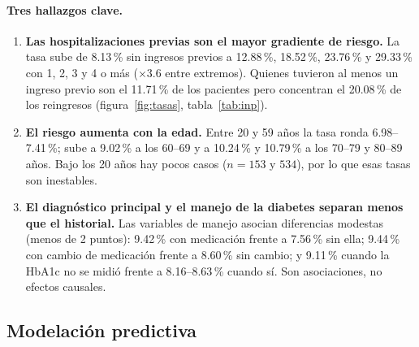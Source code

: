\documentclass[11pt,a4paper]{article}
\begin{document}
\paragraph{Tres hallazgos clave.}
\begin{enumerate}
\item \textbf{Las hospitalizaciones previas son el mayor gradiente de riesgo.} La tasa sube de 8.13\,\% sin ingresos previos a 12.88\,\%, 18.52\,\%, 23.76\,\% y 29.33\,\% con 1, 2, 3 y 4 o más ($\times$3.6 entre extremos). Quienes tuvieron al menos un ingreso previo son el 11.71\,\% de los pacientes pero concentran el 20.08\,\% de los reingresos (figura~\ref{fig:tasas}, tabla~\ref{tab:inp}).
\item \textbf{El riesgo aumenta con la edad.} Entre 20 y 59 años la tasa ronda 6.98--7.41\,\%; sube a 9.02\,\% a los 60--69 y a 10.24\,\% y 10.79\,\% a los 70--79 y 80--89 años. Bajo los 20 años hay pocos casos ($n=153$ y $534$), por lo que esas tasas son inestables.
\item \textbf{El diagnóstico principal y el manejo de la diabetes separan menos que el historial.} Las variables de manejo asocian diferencias modestas (menos de 2 puntos): 9.42\,\% con medicación frente a 7.56\,\% sin ella; 9.44\,\% con cambio de medicación frente a 8.60\,\% sin cambio; y 9.11\,\% cuando la HbA1c no se midió frente a 8.16--8.63\,\% cuando sí. Son asociaciones, no efectos causales.
\end{enumerate}

\subsection{Modelación predictiva}\label{sec:resmodelos}
\end{document}
